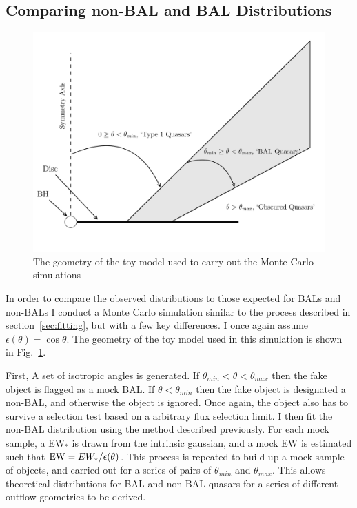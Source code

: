 \subsection{Comparing non-BAL and BAL Distributions}

\begin{figure}
\centering
\includegraphics[width=1.0\textwidth]{figures/ewpaper/fig2_cartoon.png}
\caption
{
The geometry of the toy model used to carry out the Monte Carlo simulations
}
\label{fig:cartoon}
\end{figure}

In order to compare the observed distributions to those expected for BALs and
non-BALs I conduct a Monte Carlo simulation similar to
the process described in section~\ref{sec:fitting}, but with a few 
key differences. I once again assume $\epsilon(\theta) = \cos \theta$.
The geometry of the toy model used in this simulation is shown in
Fig.~\ref{fig:cartoon}.

First, A set of isotropic angles is generated.
If $\theta_{min}<\theta<\theta_{max}$ then the fake object 
is flagged as a mock BAL. If $\theta<\theta_{min}$ then the 
fake object is designated a non-BAL, and otherwise
the object is ignored. Once again, the object also has to 
survive a selection test based on a arbitrary flux selection limit.
I then fit the non-BAL distribution using the method described previously.
For each mock sample, a EW$_*$ is drawn from the intrinsic gaussian,
and a mock EW is estimated such that ${\rm EW} = EW_* / \epsilon(\theta)$.
This process is repeated to build up a mock sample of objects, and 
carried out for a series of pairs of $\theta_{min}$ and $\theta_{max}$.
This allows theoretical distributions for BAL and non-BAL quasars
for a series of different outflow geometries to be derived.

